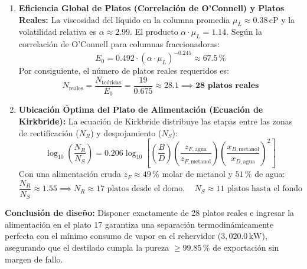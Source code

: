 \documentclass[11pt,a4paper]{article}
\begin{document}
\begin{enumerate}
    \item \textbf{Eficiencia Global de Platos (Correlación de O'Connell) y Platos Reales:}
    La viscosidad del líquido en la columna promedia $\mu_L \approx 0.38\,\text{cP}$ y la volatilidad relativa es $\alpha \approx 2.99$. El producto $\alpha \cdot \mu_L = 1.14$.
    Según la correlación de O'Connell para columnas fraccionadoras:
    \begin{equation}
        E_0 = 0.492 \cdot (\alpha \cdot \mu_L)^{-0.245} \approx \mathbf{67.5\,\%}
    \end{equation}
    Por consiguiente, el número de platos reales requeridos es:
    \begin{equation}
        N_{\text{reales}} = \frac{N_{\text{teóricas}}}{E_0} = \frac{19}{0.675} \approx \mathbf{28.1} \implies \mathbf{28\text{ platos reales}}
    \end{equation}

    \item \textbf{Ubicación Óptima del Plato de Alimentación (Ecuación de Kirkbride):}
    La ecuación de Kirkbride distribuye las etapas entre las zonas de rectificación ($N_R$) y despojamiento ($N_S$):
    \begin{equation}
        \log_{10}\left(\frac{N_R}{N_S}\right) = 0.206 \log_{10}\left[ \left(\frac{B}{D}\right) \left(\frac{z_{F,\text{agua}}}{z_{F,\text{metanol}}}\right) \left(\frac{x_{B,\text{metanol}}}{x_{D,\text{agua}}}\right)^2 \right]
    \end{equation}
    Con una alimentación cruda $z_F \approx 49\,\%$ molar de metanol y $51\,\%$ de agua:
    \begin{equation}
        \frac{N_R}{N_S} \approx 1.55 \implies N_R \approx 17\text{ platos desde el domo}, \quad N_S \approx 11\text{ platos hasta el fondo}
    \end{equation}
\end{enumerate}
\textbf{Conclusión de diseño:} Disponer exactamente de 28 platos reales e ingresar la alimentación en el plato 17 garantiza una separación termodinámicamente perfecta con el mínimo consumo de vapor en el rehervidor ($3{,}020.0\,\text{kW}$), asegurando que el destilado cumpla la pureza $\ge 99.85\,\%$ de exportación sin margen de fallo.
\end{document}
